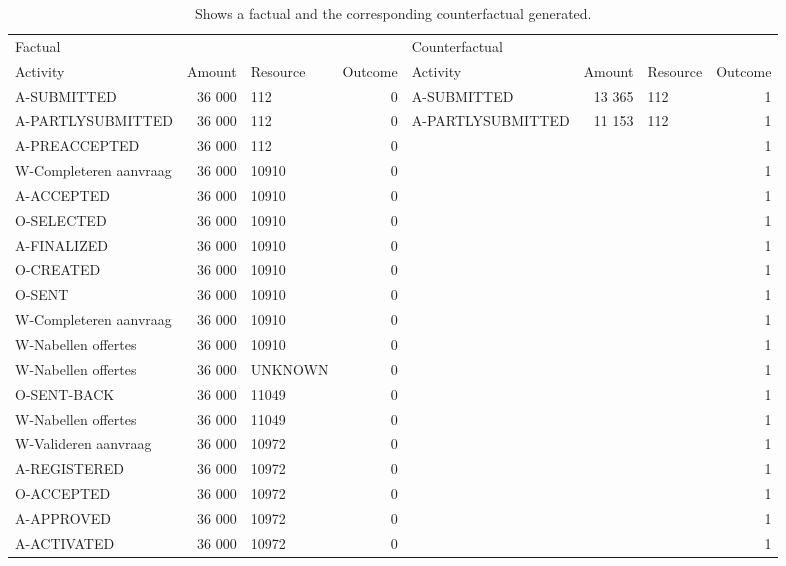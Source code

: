 \begin{table}
\caption{Shows a factual and the corresponding counterfactual generated.}
\label{tbl:example-cf}
\begin{tabular}{lrlrlrlr}
\toprule
\multicolumn{4}{l}{Factual} & \multicolumn{4}{l}{Counterfactual} \\
Activity & Amount & Resource & Outcome & Activity & Amount & Resource & Outcome \\
\midrule
A-SUBMITTED & 36 000 & 112 & 0 & A-SUBMITTED & 13 365 & 112 & 1 \\
A-PARTLYSUBMITTED & 36 000 & 112 & 0 & A-PARTLYSUBMITTED & 11 153 & 112 & 1 \\
A-PREACCEPTED & 36 000 & 112 & 0 &  &  &  & 1 \\
W-Completeren aanvraag & 36 000 & 10910 & 0 &  &  &  & 1 \\
A-ACCEPTED & 36 000 & 10910 & 0 &  &  &  & 1 \\
O-SELECTED & 36 000 & 10910 & 0 &  &  &  & 1 \\
A-FINALIZED & 36 000 & 10910 & 0 &  &  &  & 1 \\
O-CREATED & 36 000 & 10910 & 0 &  &  &  & 1 \\
O-SENT & 36 000 & 10910 & 0 &  &  &  & 1 \\
W-Completeren aanvraag & 36 000 & 10910 & 0 &  &  &  & 1 \\
W-Nabellen offertes & 36 000 & 10910 & 0 &  &  &  & 1 \\
W-Nabellen offertes & 36 000 & UNKNOWN & 0 &  &  &  & 1 \\
O-SENT-BACK & 36 000 & 11049 & 0 &  &  &  & 1 \\
W-Nabellen offertes & 36 000 & 11049 & 0 &  &  &  & 1 \\
W-Valideren aanvraag & 36 000 & 10972 & 0 &  &  &  & 1 \\
A-REGISTERED & 36 000 & 10972 & 0 &  &  &  & 1 \\
O-ACCEPTED & 36 000 & 10972 & 0 &  &  &  & 1 \\
A-APPROVED & 36 000 & 10972 & 0 &  &  &  & 1 \\
A-ACTIVATED & 36 000 & 10972 & 0 &  &  &  & 1 \\
\bottomrule
\end{tabular}
\end{table}
